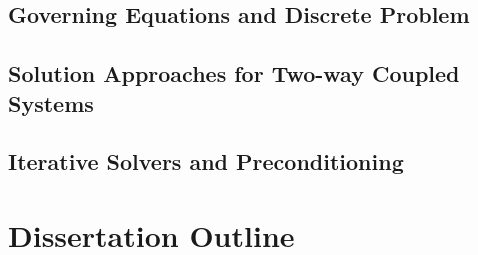 \subsection{Governing Equations and Discrete Problem}

\subsection{Solution Approaches for Two-way Coupled Systems}

\subsection{Iterative Solvers and Preconditioning}

\section{Dissertation Outline}
